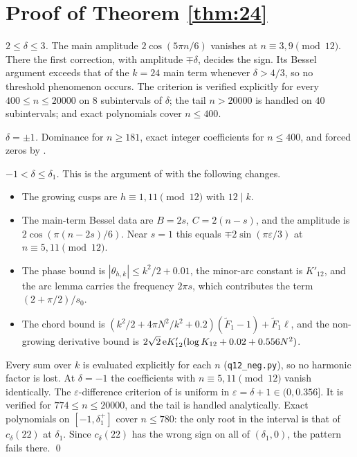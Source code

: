 \documentclass[11pt]{amsart}
\theoremstyle{remark}
\begin{document}
\section{Proof of Theorem \ref{thm:24}}
\emph{$2\le\delta\le3$.} The main amplitude $2\cos(5\pi n/6)$ vanishes at $n\equiv3,9\pmod{12}$. There the first correction, with amplitude $\mp\delta$, decides the sign. Its Bessel argument exceeds that of the $k=24$ main term whenever $\delta>4/3$, so no threshold phenomenon occurs. The criterion is verified explicitly for every $400\le n\le20000$ on $8$ subintervals of $\delta$; the tail $n>20000$ is handled on $40$ subintervals; and exact polynomials cover $n\le400$.

\emph{$\delta=\pm1$.} Dominance for $n\ge181$, exact integer coefficients for $n\le400$, and forced zeros by \cite{AB}.

\emph{$-1<\delta\le\delta_1$.} This is the argument of \cite[\S7]{P1} with the following changes.
\begin{itemize}[leftmargin=2em]
\item The growing cusps are $h\equiv1,11\pmod{12}$ with $12\mid k$.
\item The main-term Bessel data are $B=2s$, $C=2(n-s)$, and the amplitude is $2\cos(\pi(n-2s)/6)$. Near $s=1$ this equals $\mp2\sin(\pi\varepsilon/3)$ at $n\equiv5,11\pmod{12}$.
\item The phase bound is $|\theta_{h,k}|\le k^2/2+0.01$, the minor-arc constant is $K'_{12}$, and the arc lemma carries the frequency $2\pi s$, which contributes the term $(2+\pi/2)/s_0$.
\item The chord bound is $(k^2/2+4\pi N^2/k^2+0.2)(\widetilde F_1-1)+\widetilde F_1\ell$, and the non-growing derivative bound is $2\sqrt2\,\mathrm e K'_{12}(\log K_{12}+0.02+0.556N^2)$.
\end{itemize}
Every sum over $k$ is evaluated explicitly for each $n$ (\texttt{q12\_neg.py}), so no harmonic factor is lost. At $\delta=-1$ the coefficients with $n\equiv5,11\pmod{12}$ vanish identically. The $\varepsilon$-difference criterion of \cite[\S7]{P1} is uniform in $\varepsilon=\delta+1\in(0,0.356]$. It is verified for $774\le n\le20000$, and the tail is handled analytically. Exact polynomials on $[-1,\delta_1^+]$ cover $n\le780$: the only root in the interval is that of $c_\delta(22)$ at $\delta_1$. Since $c_\delta(22)$ has the wrong sign on all of $(\delta_1,0)$, the pattern fails there. \qed
\end{document}
